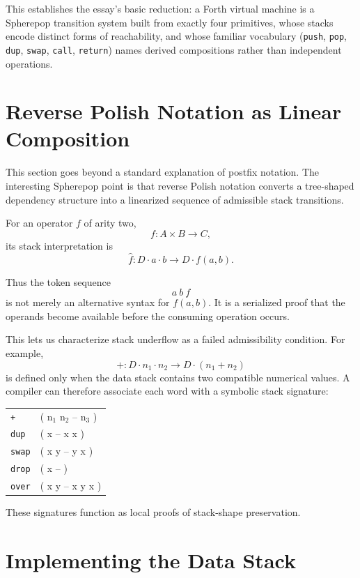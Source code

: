 \documentclass[12pt]{article}
\begin{document}
This establishes the essay's basic reduction: a Forth virtual machine is a Spherepop transition system built from exactly four primitives, whose stacks encode distinct forms of reachability, and whose familiar vocabulary (\texttt{push}, \texttt{pop}, \texttt{dup}, \texttt{swap}, \texttt{call}, \texttt{return}) names derived compositions rather than independent operations.

\section{Reverse Polish Notation as Linear Composition}

This section goes beyond a standard explanation of postfix notation. The interesting Spherepop point is that reverse Polish notation converts a tree-shaped dependency structure into a linearized sequence of admissible stack transitions.

For an operator \(f\) of arity two,
\[
f : A\times B\to C,
\]
its stack interpretation is
\[
\widehat{f} : D\cdot a\cdot b \longrightarrow D\cdot f(a,b).
\]

Thus the token sequence
\[
a\ b\ f
\]
is not merely an alternative syntax for \(f(a,b)\). It is a serialized proof that the operands become available before the consuming operation occurs.

This lets us characterize stack underflow as a failed admissibility condition. For example,
\[
+ : D\cdot n_1\cdot n_2 \to D\cdot(n_1+n_2)
\]
is defined only when the data stack contains two compatible numerical values. A compiler can therefore associate each word with a symbolic stack signature:

\begin{center}
\begin{tabular}{ll}
\texttt{+}    & ( n$_1$ n$_2$ -- n$_3$ ) \\
\texttt{dup}  & ( x -- x x ) \\
\texttt{swap} & ( x y -- y x ) \\
\texttt{drop} & ( x -- ) \\
\texttt{over} & ( x y -- x y x )
\end{tabular}
\end{center}

These signatures function as local proofs of stack-shape preservation.

\section{Implementing the Data Stack}
\end{document}
